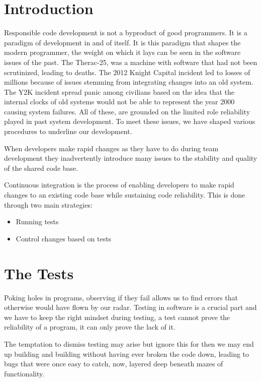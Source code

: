 \documentclass{article}
\begin{document}
\tableofcontents
\newpage
\section{Introduction}
Responsible code development is not a byproduct of good programmers.
It is a paradigm of development in and of itself. It is this paradigm that shapes
the modern programmer, the weight on which it lays can be seen in the software issues of the past.
The Therac-25, was a machine with software that had not been scrutinized, leading to deaths. The 2012 Knight Capital incident
led to losses of millions because of issues stemming from integrating changes into an old system. The Y2K incident
spread panic among civilians based on the idea that the internal clocks of old systems would not be able to represent
the year 2000 causing system failures. All of these, are grounded on the limited role reliability played in past system development.
To meet these issues, we have shaped various procedures to underline our development. 

When developers make rapid changes as they have to do during team development 
they inadvertently introduce many issues to the stability and quality of the shared code base.

Continuous integration is the process of enabling developers to make rapid changes to an existing code base while sustaining
code reliability. This is done through two main strategies:

\begin{itemize}
    \item Running tests
    \item Control changes based on tests
\end{itemize}

\section{The Tests}

Poking holes in programs, observing if they fail allows us to find errors that otherwise would
have flown by our radar. Testing in software is a crucial part and we have to keep the right mindset during testing, 
a test cannot prove the reliability of a program, it can only prove the lack of it.\cite{meyer_seven_2008}

The temptation to dismiss testing may arise but ignore this for then we may end up building and building without having ever broken the code down, 
leading to bugs that were once easy to catch, now, layered deep beneath mazes of functionality.
\end{document}
